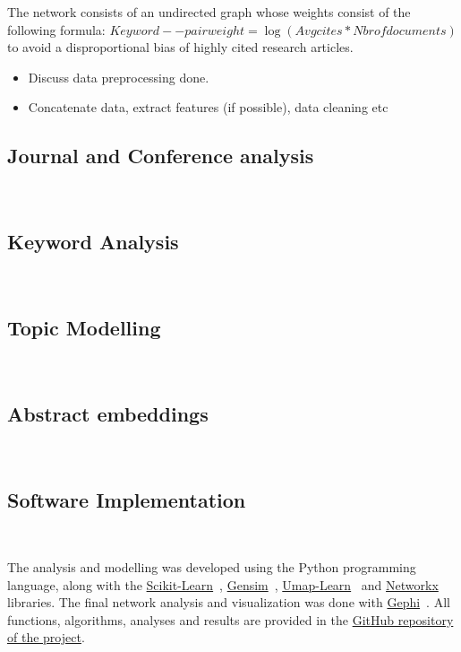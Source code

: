 \documentclass[parskip=full]{scrartcl}
\begin{document}
The network consists of an undirected graph whose weights consist of the
following formula: $Keyword--pair weight = \log(Avg cites * Nbr of documents)$
to avoid a disproportional bias of highly cited research articles.

\begin{itemize}
    \item Discuss data preprocessing done.
    \item Concatenate data, extract features (if possible), data cleaning etc
\end{itemize}

\subsection{Journal and Conference analysis}~\label{sec:journal_and_conference_analysis}

\subsection{Keyword Analysis}~\label{sec:keyword_analysis}

\subsection{Topic Modelling}~\label{sec:topic_modelling}

\subsection{Abstract embeddings}~\label{sec:abstract_embeddings}

\subsection{Software Implementation}~\label{sec:software_implementation}

The analysis and modelling was developed using the Python programming
language, along with the
\href{https://scikit-learn.org/stable/}{Scikit-Learn}~\cite{Pedregosa2011},
\href{https://radimrehurek.com/gensim/}{Gensim}~\cite{Rehurek2010},
\href{https://github.com/lmcinnes/umap}{Umap-Learn}~\cite{Mcinnes2018} and
\href{https://networkx.org/}{Networkx}~\cite{Hagberg2008} libraries. The final
network analysis and visualization was done with
\href{https://gephi.org/}{Gephi}~\cite{Bastian2009}. All functions,
algorithms, analyses and results are provided in the
\href{https://github.com/joaopfonseca/research}{GitHub repository of the
project}.
\end{document}

